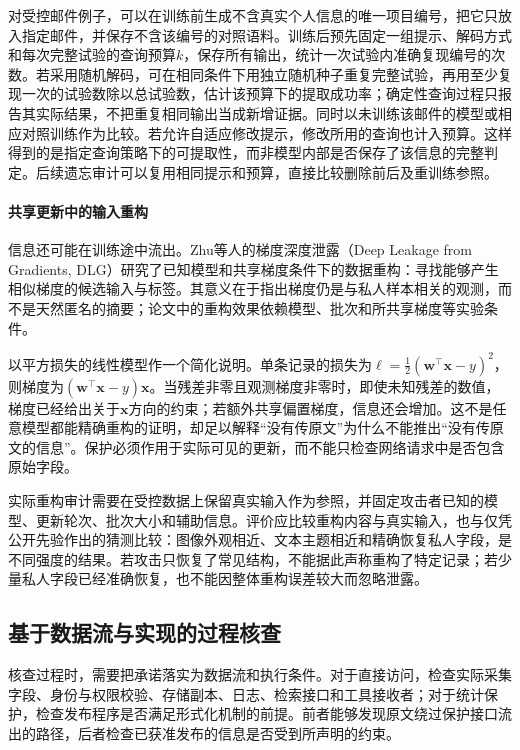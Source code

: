 对受控邮件例子，可以在训练前生成不含真实个人信息的唯一项目编号，把它只放入指定邮件，并保存不含该编号的对照语料。训练后预先固定一组提示、解码方式和每次完整试验的查询预算$k$，保存所有输出，统计一次试验内准确复现编号的次数。若采用随机解码，可在相同条件下用独立随机种子重复完整试验，再用至少复现一次的试验数除以总试验数，估计该预算下的提取成功率；确定性查询过程只报告其实际结果，不把重复相同输出当成新增证据。同时以未训练该邮件的模型或相应对照训练作为比较。若允许自适应修改提示，修改所用的查询也计入预算。这样得到的是指定查询策略下的可提取性，而非模型内部是否保存了该信息的完整判定。后续遗忘审计可以复用相同提示和预算，直接比较删除前后及重训练参照。

\paragraph{共享更新中的输入重构}

信息还可能在训练途中流出。Zhu等人的梯度深度泄露（Deep Leakage from Gradients, DLG）研究了已知模型和共享梯度条件下的数据重构：寻找能够产生相似梯度的候选输入与标签。其意义在于指出梯度仍是与私人样本相关的观测，而不是天然匿名的摘要；论文中的重构效果依赖模型、批次和所共享梯度等实验条件。

以平方损失的线性模型作一个简化说明。单条记录的损失为$\ell=\tfrac12(\bm w^\top\bm x-y)^2$，则梯度为$(\bm w^\top\bm x-y)\bm x$。当残差非零且观测梯度非零时，即使未知残差的数值，梯度已经给出关于$\bm x$方向的约束；若额外共享偏置梯度，信息还会增加。这不是任意模型都能精确重构的证明，却足以解释“没有传原文”为什么不能推出“没有传原文的信息”。保护必须作用于实际可见的更新，而不能只检查网络请求中是否包含原始字段。

实际重构审计需要在受控数据上保留真实输入作为参照，并固定攻击者已知的模型、更新轮次、批次大小和辅助信息。评价应比较重构内容与真实输入，也与仅凭公开先验作出的猜测比较：图像外观相近、文本主题相近和精确恢复私人字段，是不同强度的结果。若攻击只恢复了常见结构，不能据此声称重构了特定记录；若少量私人字段已经准确恢复，也不能因整体重构误差较大而忽略泄露。

\subsection{基于数据流与实现的过程核查}
\label{sec:privacy-implementation-verification}

核查过程时，需要把承诺落实为数据流和执行条件。对于直接访问，检查实际采集字段、身份与权限校验、存储副本、日志、检索接口和工具接收者；对于统计保护，检查发布程序是否满足形式化机制的前提。前者能够发现原文绕过保护接口流出的路径，后者检查已获准发布的信息是否受到所声明的约束。

